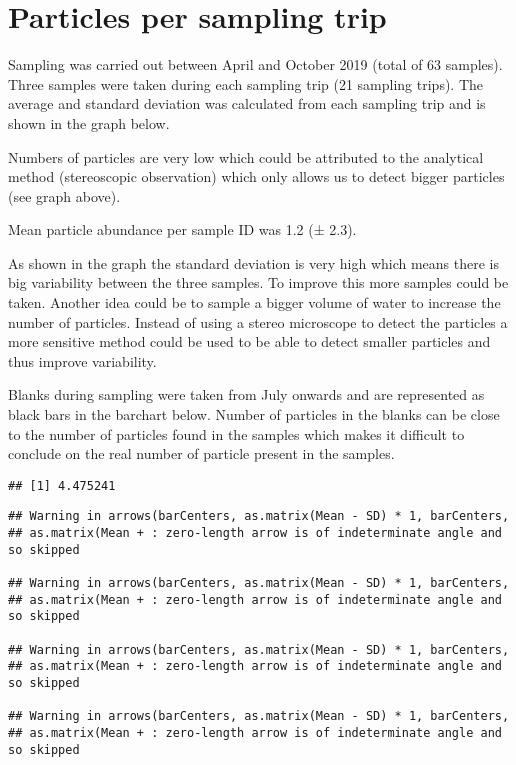 \documentclass[
  icelandic,
]{book}
\begin{document}
\hypertarget{particles-per-sampling-trip}{%
\section{Particles per sampling trip}\label{particles-per-sampling-trip}}

Sampling was carried out between April and October 2019 (total of 63 samples). Three samples were taken during each sampling trip (21 sampling trips). The average and standard deviation was calculated from each sampling trip and is shown in the graph below.

Numbers of particles are very low which could be attributed to the analytical method (stereoscopic observation) which only allows us to detect bigger particles (see graph above).

Mean particle abundance per sample ID was 1.2 (± 2.3).

As shown in the graph the standard deviation is very high which means there is big variability between the three samples. To improve this more samples could be taken. Another idea could be to sample a bigger volume of water to increase the number of particles. Instead of using a stereo microscope to detect the particles a more sensitive method could be used to be able to detect smaller particles and thus improve variability.

Blanks during sampling were taken from July onwards and are represented as black bars in the barchart below. Number of particles in the blanks can be close to the number of particles found in the samples which makes it difficult to conclude on the real number of particle present in the samples.

\begin{verbatim}
## [1] 4.475241
\end{verbatim}

\begin{verbatim}
## Warning in arrows(barCenters, as.matrix(Mean - SD) * 1, barCenters,
## as.matrix(Mean + : zero-length arrow is of indeterminate angle and so skipped

## Warning in arrows(barCenters, as.matrix(Mean - SD) * 1, barCenters,
## as.matrix(Mean + : zero-length arrow is of indeterminate angle and so skipped

## Warning in arrows(barCenters, as.matrix(Mean - SD) * 1, barCenters,
## as.matrix(Mean + : zero-length arrow is of indeterminate angle and so skipped

## Warning in arrows(barCenters, as.matrix(Mean - SD) * 1, barCenters,
## as.matrix(Mean + : zero-length arrow is of indeterminate angle and so skipped
\end{verbatim}
\end{document}
